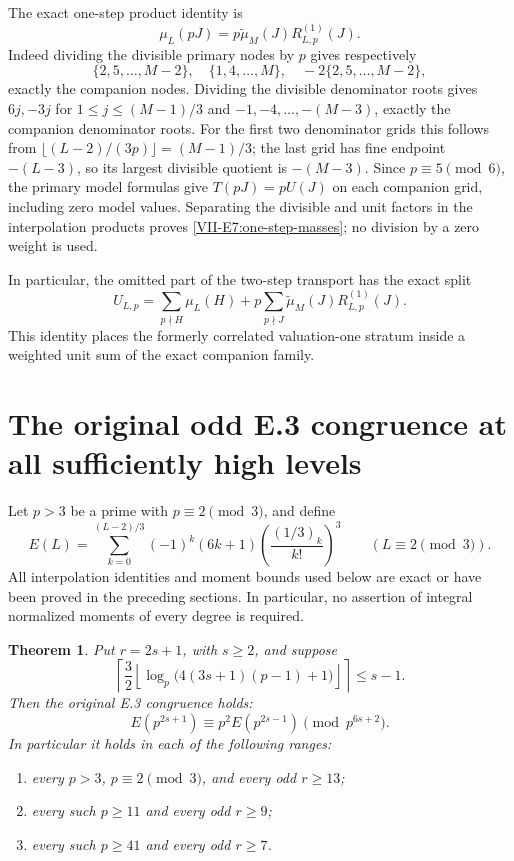 \documentclass[11pt,letterpaper]{article}
\newtheorem{theorem}{Theorem}[section]
\numberwithin{equation}{section}
\begin{document}
The exact one-step product identity is
\begin{equation}\label{VII-E7:one-step-masses}
 \mu_L(pJ)=p\widetilde\mu_M(J)R^{(1)}_{L,p}(J).
\end{equation}
Indeed dividing the divisible primary nodes by $p$ gives respectively
\[
 \{2,5,\ldots,M-2\},\quad
 \{1,4,\ldots,M\},\quad
 -2\{2,5,\ldots,M-2\},
\]
exactly the companion nodes. Dividing the divisible denominator roots
gives $6j,-3j$ for $1\le j\le(M-1)/3$ and
$-1,-4,\ldots,-(M-3)$, exactly the companion denominator roots.
For the first two denominator grids this follows from
$\lfloor(L-2)/(3p)\rfloor=(M-1)/3$; the last grid has fine endpoint
$-(L-3)$, so its largest divisible quotient is $-(M-3)$.
Since $p\equiv5\pmod6$, the primary model formulas give
$T(pJ)=pU(J)$ on each companion grid, including zero model values.
Separating the divisible and unit factors in the interpolation products
proves \eqref{VII-E7:one-step-masses}; no division by a zero weight is used.

In particular, the omitted part of the two-step transport has the exact
split
\begin{equation}\label{VII-E7:U-one-step}
 U_{L,p}
 =\sum_{p\nmid H}\mu_L(H)
 +p\sum_{p\nmid J}\widetilde\mu_M(J)R^{(1)}_{L,p}(J).
\end{equation}
This identity places the formerly correlated valuation-one stratum
inside a weighted unit sum of the exact companion family.


\section{The original odd E.3 congruence at all sufficiently high levels}\label{loc-VII-10}
\label{VII-sec:e-high-level-closure}
Let $p>3$ be a prime with $p\equiv2\pmod3$, and define
\[
 E(L)=\sum_{k=0}^{(L-2)/3}(-1)^k(6k+1)
          \left(\frac{(1/3)_k}{k!}\right)^3
 \qquad(L\equiv2\pmod3).
\]
All interpolation identities and moment bounds used below are exact
or have been proved in the preceding sections. In particular, no
assertion of integral normalized moments of every degree is required.

\begin{theorem}\label{VII-thm:e-high-level-closure}
Put $r=2s+1$, with $s\ge2$, and suppose
\begin{equation}\label{VII-eq:e-improved-threshold}
 \left\lceil\frac32\left\lfloor
 \log_p\bigl(4(3s+1)(p-1)+1\bigr)\right\rfloor\right\rceil
 \le s-1.
\end{equation}
Then the original E.3 congruence holds:
\[
 \boxed{E(p^{2s+1})\equiv p^2E(p^{2s-1})\pmod{p^{6s+2}}.}
\]
In particular it holds in each of the following ranges:
\begin{enumerate}
 \item every $p>3$, $p\equiv2\pmod3$, and every odd $r\ge13$;
 \item every such $p\ge11$ and every odd $r\ge9$;
 \item every such $p\ge41$ and every odd $r\ge7$.
\end{enumerate}
\end{theorem}
\end{document}
